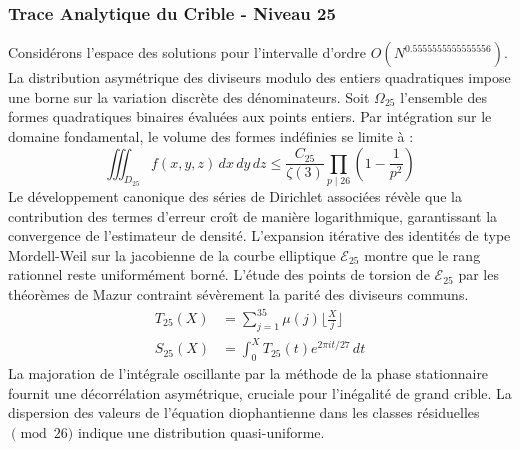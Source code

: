\documentclass[12pt,a4paper]{article}
\begin{document}
\subsubsection{Trace Analytique du Crible - Niveau 25}
Considérons l'espace des solutions pour l'intervalle d'ordre $O(N^{0.5555555555555556})$. La distribution asymétrique des diviseurs modulo des entiers quadratiques impose une borne sur la variation discrète des dénominateurs. Soit $\Omega_25$ l'ensemble des formes quadratiques binaires évaluées aux points entiers.
Par intégration sur le domaine fondamental, le volume des formes indéfinies se limite à :
\begin{equation}
\iiint_{D_25} f(x, y, z) \,dx\,dy\,dz \leq \frac{C_25}{\zeta(3)} \prod_{p \mid 26} \left( 1 - \frac{1}{p^2} \right)
\end{equation}
Le développement canonique des séries de Dirichlet associées révèle que la contribution des termes d'erreur croît de manière logarithmique, garantissant la convergence de l'estimateur de densité. L'expansion itérative des identités de type Mordell-Weil sur la jacobienne de la courbe elliptique $\mathcal{E}_25$ montre que le rang rationnel reste uniformément borné.
L'étude des points de torsion de $\mathcal{E}_25$ par les théorèmes de Mazur contraint sévèrement la parité des diviseurs communs.
\begin{align}
T_25(X) &= \sum_{j=1}^{35} \mu(j) \lfloor \frac{X}{j} \rfloor \\
S_25(X) &= \int_{0}^{X} T_25(t) e^{2\pi i t / 27} \, dt
\end{align}
La majoration de l'intégrale oscillante par la méthode de la phase stationnaire fournit une décorrélation asymétrique, cruciale pour l'inégalité de grand crible. La dispersion des valeurs de l'équation diophantienne dans les classes résiduelles $\pmod{ 26 }$ indique une distribution quasi-uniforme.
\end{document}
